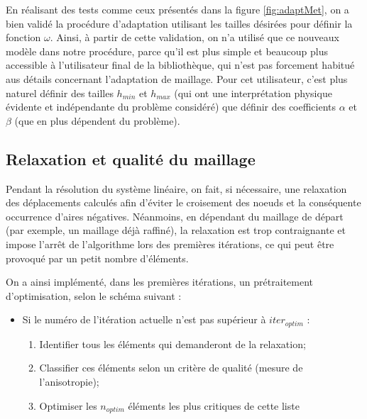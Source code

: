 \endgroup

\indent

\indent En réalisant des tests comme ceux présentés dans la figure \ref{fig:adaptMet}, on a bien validé la procédure d'adaptation utilisant les tailles désirées pour définir la fonction $\omega$. Ainsi, à partir de cette validation, on n'a utilisé que ce nouveaux modèle dans notre procédure, parce qu'il est plus simple et beaucoup plus accessible à l'utilisateur final de la bibliothèque, qui n'est pas forcement habitué aus détails concernant l'adaptation de maillage. Pour cet utilisateur, c'est plus naturel définir des tailles $h_{min}$ et $h_{max}$ (qui ont une interprétation physique évidente et indépendante du problème considéré) que définir des coefficients $\alpha$ et $\beta$ (que en plus dépendent du problème). 


\subsection{Relaxation et qualité du maillage}

\indent Pendant la résolution du système linéaire, on fait, si nécessaire, une relaxation des déplacements calculés afin d'éviter le croisement des noeuds et la conséquente occurrence d'aires négatives. Néanmoins, en dépendant du maillage de départ (par exemple, un maillage déjà raffiné), la relaxation est trop contraignante et impose l'arrêt de l'algorithme lors des premières itérations, ce qui peut être provoqué par un petit nombre d'éléments.

\indent On a ainsi implémenté, dans les premières itérations, un prétraitement d'optimisation, selon le schéma suivant :

\begin{itemize}
  \item Si le numéro de l'itération actuelle n'est pas supérieur à \(iter_{optim}\) : 
  \begin{enumerate}
    \item Identifier tous les éléments qui demanderont de la relaxation;
    \item Classifier ces éléments selon un critère de qualité (mesure de l'anisotropie);
    \item Optimiser les \(n_{optim}\) éléments les plus critiques de cette liste
  \end{enumerate}   
\end{itemize}

